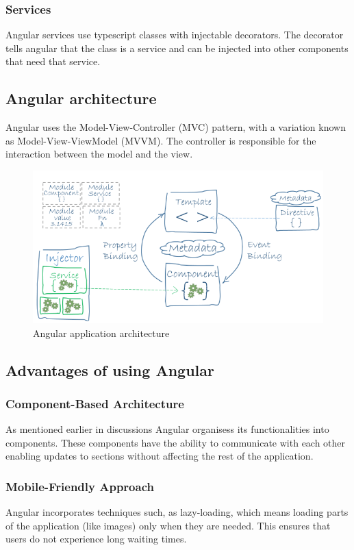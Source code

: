 \subsubsection{Services} Angular services use typescript classes with injectable decorators. The decorator tells angular that the class is a service and can be injected into other components that need that service.\cite{angular-services}


\subsection{Angular architecture}
Angular uses the Model-View-Controller (MVC) pattern, with a variation known as Model-View-ViewModel (MVVM). The controller is responsible for the interaction between the model and the view.

\begin{figure}[ht]
    \centering
    \includegraphics[width=0.85\linewidth]{images/angular-arch.png}
    \caption{Angular application architecture}
    \label{fig:angular-arch}
\end{figure}

\subsection{Advantages of using Angular}
\subsubsection{Component-Based Architecture}
As mentioned earlier in discussions Angular organisess its functionalities into components. These components have the ability to communicate with each other enabling updates to sections without affecting the rest of the application.

\subsubsection{Mobile-Friendly Approach}
Angular incorporates techniques such, as lazy-loading, which means loading parts of the application (like images) only when they are needed. This ensures that users do not experience long waiting times.


